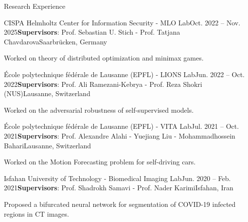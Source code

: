 \documentclass{resume}
\begin{document}
\begin{rSection}{Research Experience}

\begin{rSubsection}{CISPA Helmholtz Center for Information Security - MLO Lab}{Oct. 2022 -- Nov. 2025}{\textbf{Supervisors}: Prof. Sebastian U. Stich - Prof. Tatjana Chavdarova}{Saarbr\"ucken, Germany}
    \item Worked on theory of distributed optimization and minimax games.
\end{rSubsection}

\begin{rSubsection}{\'Ecole polytechnique f\'ed\'erale de Lausanne (EPFL) - LIONS Lab}{Jun. 2022 -- Oct. 2022}{\textbf{Supervisors}: Prof. Ali Ramezani-Kebrya - Prof. Reza Shokri (NUS)}{Lausanne, Switzerland}
    \item Worked on the adversarial robustness of self-supervised models.
\end{rSubsection}

\begin{rSubsection}{\'Ecole polytechnique f\'ed\'erale de Lausanne (EPFL) - VITA Lab}{Jul. 2021 -- Oct. 2021}{\textbf{Supervisors}: Prof. Alexandre Alahi - Yuejiang Liu - Mohammadhossein Bahari}{Lausanne, Switzerland}
    \item Worked on the Motion Forecasting problem for self-driving cars.
\end{rSubsection}

\begin{rSubsection}{Isfahan University of Technology - Biomedical Imaging Lab}{Jun. 2020 -- Feb. 2021}{\textbf{Supervisors}: Prof. Shadrokh Samavi - Prof. Nader Karimi}{Isfahan, Iran}
    \item Proposed a bifurcated neural network for segmentation of COVID-19 infected regions in CT images.
\end{rSubsection}

\end{rSection}
\end{document}
